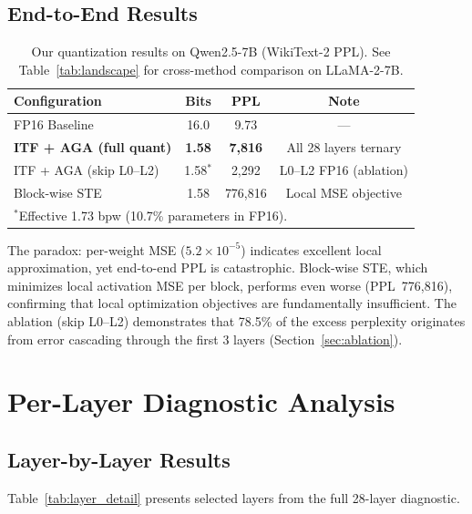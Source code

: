 \documentclass[10pt,a4paper]{article}
\begin{document}
\subsection{End-to-End Results}

\begin{table}[htbp]
\centering
\caption{Our quantization results on Qwen2.5-7B (WikiText-2 PPL). See Table~\ref{tab:landscape} for cross-method comparison on LLaMA-2-7B.}
\label{tab:results}
\begin{tabular}{lccc}
\toprule
\textbf{Configuration} & \textbf{Bits} & \textbf{PPL} & \textbf{Note} \\
\midrule
FP16 Baseline & 16.0 & 9.73 & --- \\
\textbf{ITF + AGA (full quant)} & \textbf{1.58} & \textbf{7,816} & All 28 layers ternary \\
ITF + AGA (skip L0--L2) & 1.58$^*$ & 2,292 & L0--L2 FP16 (ablation) \\
Block-wise STE & 1.58 & 776,816 & Local MSE objective \\
\bottomrule
\multicolumn{4}{l}{\footnotesize $^*$Effective 1.73 bpw (10.7\% parameters in FP16).}
\end{tabular}
\end{table}

The paradox: per-weight MSE ($5.2 \times 10^{-5}$) indicates excellent local approximation, yet end-to-end PPL is catastrophic.
Block-wise STE, which minimizes local activation MSE per block, performs even worse (PPL~776,816), confirming that local optimization objectives are fundamentally insufficient.
The ablation (skip L0--L2) demonstrates that 78.5\% of the excess perplexity originates from error cascading through the first 3 layers (Section~\ref{sec:ablation}).

\section{Per-Layer Diagnostic Analysis}
\label{sec:analysis}

\subsection{Layer-by-Layer Results}

Table~\ref{tab:layer_detail} presents selected layers from the full 28-layer diagnostic.
\end{document}
